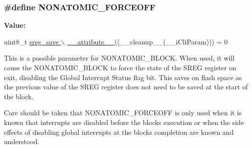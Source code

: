 \subsubsection[{\texorpdfstring{N\+O\+N\+A\+T\+O\+M\+I\+C\+\_\+\+F\+O\+R\+C\+E\+O\+FF}{NONATOMIC_FORCEOFF}}]{\setlength{\rightskip}{0pt plus 5cm}\#define N\+O\+N\+A\+T\+O\+M\+I\+C\+\_\+\+F\+O\+R\+C\+E\+O\+FF}\hypertarget{group__util__atomic_gafb959d7d00d2d790b58d0e9880ea255a}{}\label{group__util__atomic_gafb959d7d00d2d790b58d0e9880ea255a}
{\bfseries Value\+:}
\begin{DoxyCode}
uint8\_t \hyperlink{stdint_8h_a772744ca0816d59e120b8f8a1ede64f0}{sreg\_save \(\backslash\)}
\hyperlink{stdint_8h_a772744ca0816d59e120b8f8a1ede64f0}{    \_\_attribute\_\_}((\_\_cleanup\_\_(\_\_iCliParam))) = 0
\end{DoxyCode}
This is a possible parameter for N\+O\+N\+A\+T\+O\+M\+I\+C\+\_\+\+B\+L\+O\+CK. When used, it will cause the N\+O\+N\+A\+T\+O\+M\+I\+C\+\_\+\+B\+L\+O\+CK to force the state of the S\+R\+EG register on exit, disabling the Global Interrupt Status flag bit. This saves on flash space as the previous value of the S\+R\+EG register does not need to be saved at the start of the block.

Care should be taken that N\+O\+N\+A\+T\+O\+M\+I\+C\+\_\+\+F\+O\+R\+C\+E\+O\+FF is only used when it is known that interrupts are disabled before the block\textquotesingle{}s execution or when the side effects of disabling global interrupts at the block\textquotesingle{}s completion are known and understood. 
